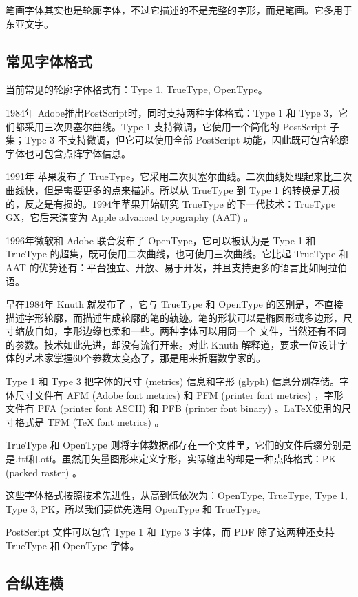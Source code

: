 笔画字体其实也是轮廓字体，不过它描述的不是完整的字形，而是笔画。它多用于东亚文字。

\subsection{常见字体格式}

当前常见的轮廓字体格式有：Type 1, TrueType, OpenType。

1984年 Adobe\indexAdobe 推出PostScript时，同时支持两种字体格式：Type 1 和 Type 3，它们都采用三次贝塞尔曲线。Type 1 支持微调，它使用一个简化的 PostScript 子集；Type 3 不支持微调，但它可以使用全部 PostScript 功能，因此既可包含轮廓字体也可包含点阵字体信息。

1991年 苹果\indexApple 发布了 TrueType，它采用二次贝塞尔曲线。二次曲线处理起来比三次曲线快，但是需要更多的点来描述。所以从 TrueType 到 Type 1 的转换是无损的，反之是有损的。1994年苹果开始研究 TrueType 的下一代技术：TrueType GX，它后来演变为 Apple advanced typography (AAT) 。

1996年微软和 Adobe 联合发布了 OpenType，它可以被认为是 Type 1 和 TrueType 的超集，既可使用二次曲线，也可使用三次曲线。它比起 TrueType 和 AAT 的优势还有：平台独立、开放、易于开发，并且支持更多的语言比如阿拉伯语。

早在1984年 Knuth 就发布了 \MF ，它与 TrueType 和 OpenType 的区别是，不直接描述字形轮廓，而描述生成轮廓的笔的轨迹。笔的形状可以是椭圆形或多边形，尺寸缩放自如，字形边缘也柔和一些。两种字体可以用同一个 \MF 文件，当然还有不同的参数。\MF 技术如此先进，却没有流行开来。对此 Knuth 解释道，要求一位设计字体的艺术家掌握60个参数太变态了，那是用来折磨数学家的。

Type 1 和 Type 3 把字体的尺寸 (metrics) 信息和字形 (glyph) 信息分别存储。字体尺寸文件有 AFM (Adobe font metrics) 和 PFM (printer font metrics) ，字形文件有 PFA (printer font ASCII) 和 PFB (printer font binary) 。\LaTeX 使用的尺寸格式是 TFM (TeX font metrics) 。

TrueType 和 OpenType 则将字体数据都存在一个文件里，它们的文件后缀分别是是.ttf和.otf。\MF{}虽然用矢量图形来定义字形，实际输出的却是一种点阵格式：PK (packed raster) 。

这些字体格式按照技术先进性，从高到低依次为：OpenType, TrueType, Type 1, Type 3, PK，所以我们要优先选用 OpenType 和 TrueType。

PostScript 文件可以包含 Type 1 和 Type 3 字体，而 PDF 除了这两种还支持 TrueType 和 OpenType 字体。

\subsection{合纵连横}

